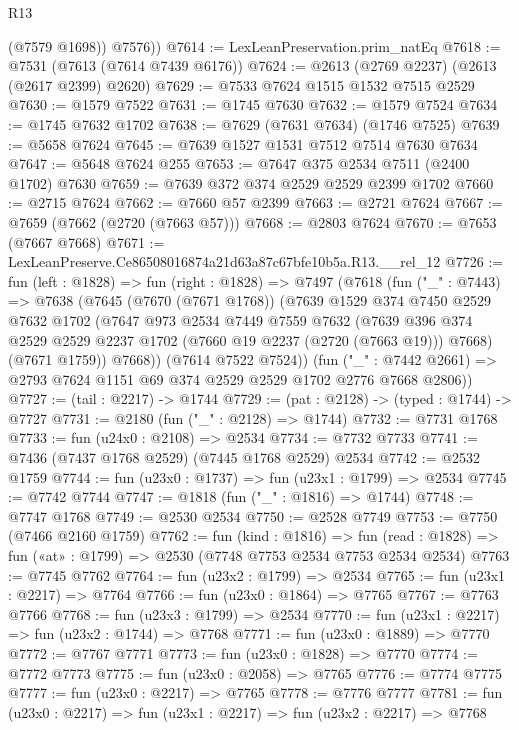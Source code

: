 \begin{lexlean}{R13}
\begin{coremodule}
          (@7579 @1698))
        @7576))
@7614 := LexLeanPreservation.prim_natEq
@7618 := @7531 (@7613 (@7614 @7439 @6176))
@7624 := @2613 (@2769 @2237) (@2613 (@2617 @2399) @2620)
@7629 := @7533 @7624 @1515 @1532 @7515 @2529
@7630 := @1579 @7522
@7631 := @1745 @7630
@7632 := @1579 @7524
@7634 := @1745 @7632 @1702
@7638 := @7629 (@7631 @7634) (@1746 @7525)
@7639 := @5658 @7624
@7645 := @7639 @1527 @1531 @7512 @7514 @7630 @7634
@7647 := @5648 @7624 @255
@7653 := @7647 @375 @2534 @7511 (@2400 @1702) @7630
@7659 := @7639 @372 @374 @2529 @2529 @2399 @1702
@7660 := @2715 @7624
@7662 := @7660 @57 @2399
@7663 := @2721 @7624
@7667 := @7659 (@7662 (@2720 (@7663 @57)))
@7668 := @2803 @7624
@7670 := @7653 (@7667 @7668)
@7671 := LexLeanPreserve.Ce86508016874a21d63a87c67bfe10b5a.R13.__rel_12
@7726 := fun (left : @1828) =>
  fun (right : @1828) =>
  @7497
    (@7618
      (fun ("_" : @7443) =>
      @7638
        (@7645
          (@7670 (@7671 @1768))
          (@7639
            @1529
            @374
            @7450
            @2529
            @7632
            @1702
            (@7647
              @973
              @2534
              @7449
              @7559
              @7632
              (@7639 @396 @374 @2529 @2529 @2237 @1702 (@7660 @19 @2237 (@2720 (@7663 @19))) @7668)
              (@7671 @1759))
            @7668))
        (@7614 @7522 @7524))
      (fun ("_" : @7442 @2661) => @2793 @7624 @1151 @69 @374 @2529 @2529 @1702 @2776 @7668 @2806))
@7727 := (tail : @2217) -> @1744
@7729 := (pat : @2128) -> (typed : @1744) -> @7727
@7731 := @2180 (fun ("_" : @2128) => @1744)
@7732 := @7731 @1768
@7733 := fun (u24x0 : @2108) => @2534
@7734 := @7732 @7733
@7741 := @7436 (@7437 @1768 @2529) (@7445 @1768 @2529) @2534
@7742 := @2532 @1759
@7744 := fun (u23x0 : @1737) => fun (u23x1 : @1799) => @2534
@7745 := @7742 @7744
@7747 := @1818 (fun ("_" : @1816) => @1744)
@7748 := @7747 @1768
@7749 := @2530 @2534
@7750 := @2528 @7749
@7753 := @7750 (@7466 @2160 @1759)
@7762 := fun (kind : @1816) =>
  fun (read : @1828) => fun («at» : @1799) => @2530 (@7748 @7753 @2534 @7753 @2534 @2534)
@7763 := @7745 @7762
@7764 := fun (u23x2 : @1799) => @2534
@7765 := fun (u23x1 : @2217) => @7764
@7766 := fun (u23x0 : @1864) => @7765
@7767 := @7763 @7766
@7768 := fun (u23x3 : @1799) => @2534
@7770 := fun (u23x1 : @2217) => fun (u23x2 : @1744) => @7768
@7771 := fun (u23x0 : @1889) => @7770
@7772 := @7767 @7771
@7773 := fun (u23x0 : @1828) => @7770
@7774 := @7772 @7773
@7775 := fun (u23x0 : @2058) => @7765
@7776 := @7774 @7775
@7777 := fun (u23x0 : @2217) => @7765
@7778 := @7776 @7777
@7781 := fun (u23x0 : @2217) => fun (u23x1 : @2217) => fun (u23x2 : @2217) => @7768

\end{coremodule}
\end{lexlean}
